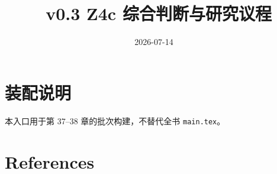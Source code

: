 \documentclass[UTF8,a4paper,12pt,openany]{ctexbook}
\title{\ReportTitle\ v0.3 Z4c 综合判断与研究议程}
\author{\ReportAuthor}
\date{2026-07-14}
\begin{document}
\frontmatter
\maketitle
\chapter*{装配说明}
本入口用于第 37--38 章的批次构建，不替代全书 \texttt{main.tex}。
\tableofcontents
\mainmatter
\setcounter{chapter}{36}


\backmatter
\chapter{References}
\printbibliography[heading=none]
\end{document}
